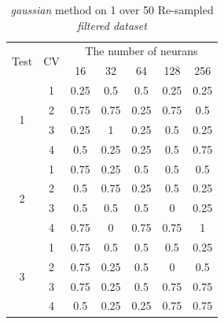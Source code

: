 \documentclass[draft,dvipsnames]{drexel-thesis}
\begin{document}
\begin{thesis}
\begin{table}[!t]
\centering
\caption{{\em gaussian} method on 1 over 50 Re-sampled {\em filtered dataset}}
\label{tbl:gaussian_1_50}
\begin{tabular}{|c|c|c|c|c|c|c|}
\hline
\multirow{2}{*}{Test} & \multirow{2}{*}{CV} & \multicolumn{5}{c|}{The number of neurans}                              \\ \cline{3-7}
                      &                     & 16           & 32           & 64           & 128         & 256          \\ \hline
\multirow{4}{*}{1}    & 1                   & 0.25         & 0.5          & 0.5          & 0.25        & 0.25         \\ \cline{2-7}
                      & 2                   & 0.75         & 0.75         & 0.25         & 0.75        & 0.5          \\ \cline{2-7}
                      & 3                   & 0.25         & 1            & 0.25         & 0.5         & 0.25         \\ \cline{2-7}
                      & 4                   & 0.5          & 0.25         & 0.25         & 0.5         & 0.75         \\ \hline
\multirow{4}{*}{2}    & 1                   & 0.75         & 0.25         & 0.5          & 0.5         & 0.5          \\ \cline{2-7}
                      & 2                   & 0.5          & 0.75         & 0.25         & 0.5         & 0.25         \\ \cline{2-7}
                      & 3                   & 0.5          & 0.5          & 0.5          & 0           & 0.25         \\ \cline{2-7}
                      & 4                   & 0.75         & 0            & 0.75         & 0.75        & 1            \\ \hline
\multirow{4}{*}{3}    & 1                   & 0.75         & 0.5          & 0.5          & 0.5         & 0.25         \\ \cline{2-7}
                      & 2                   & 0.75         & 0.25         & 0.5          & 0           & 0.5          \\ \cline{2-7}
                      & 3                   & 0.75         & 0.25         & 0.5          & 0.75        & 0.75         \\ \cline{2-7}
                      & 4                   & 0.5          & 0.25         & 0.25         & 0.75        & 0.75         \\ \hline

\end{tabular}
\end{table}
\end{thesis}
\end{document}
